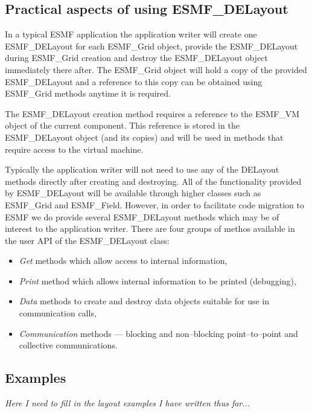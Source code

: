 
\subsection{Practical aspects of using ESMF\_DELayout}
In a typical ESMF application the application writer will create one ESMF\_DELayout for each ESMF\_Grid object, provide the ESMF\_DELayout during ESMF\_Grid creation and destroy the ESMF\_DELayout object immediately there after. The ESMF\_Grid object will hold a copy of the provided ESMF\_DELayout and a reference to this copy can be obtained using ESMF\_Grid methods anytime it is required.

The ESMF\_DELayout creation method requires a reference to the ESMF\_VM object of the current component. This reference is stored in the ESMF\_DELayout object (and its copies) and will be used in methods that require access to the virtual machine.

Typically the application writer will not need to use any of the DELayout methods directly after creating and destroying. All of the functionality provided by ESMF\_DELayout will be available through higher classes such as ESMF\_Grid and ESMF\_Field. However, in order to facilitate code migration to ESMF we do provide several ESMF\_DELayout methods which may be of interest to the application writer. There are four groups of methos available in the user API of the ESMF\_DELayout class:
\begin{itemize}
\item {\em Get} methods which allow access to internal information,
\item {\em Print} method which allows internal information to be printed (debugging),
\item {\em Data} methods to create and destroy data objects suitable for use in communication calls,
\item {\em Communication} methods --- blocking and non--blocking point--to--point and collective communications.
\end{itemize}

\subsection{Examples}
{\em Here I need to fill in the layout examples I have written thus far...}
